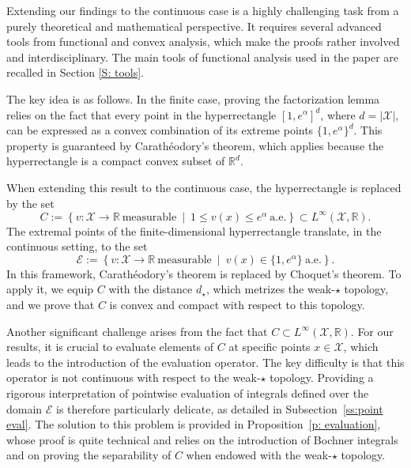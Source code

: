 \documentclass[a4paper, 11pt]{article}
\theoremstyle{definition}
\newcommand{\theconvex}{C}
\begin{document}
{Extending our findings to the continuous case is a highly challenging task from a purely theoretical and mathematical perspective. It requires several advanced tools from functional and convex analysis, 
which make the proofs rather involved and interdisciplinary. %
The main tools of functional analysis used in the paper are recalled in Section \ref{S: tools}.  


The key idea is as follows. In the finite case, proving the factorization lemma relies on the fact that every point in the hyperrectangle \([1, e^\alpha]^d\), where \(d = |\mathcal{X}|\), can be expressed as a convex combination of its extreme points \(\{1, e^\alpha\}^d\). This property is guaranteed by Carathéodory’s theorem, which applies because the hyperrectangle is a compact convex subset of \(\mathbb{R}^d\).

When extending this result to the continuous case, the hyperrectangle is replaced by the set
\[
\theconvex := \left\{ v : \mathcal{X} \rightarrow \mathbb{R} \ \text{measurable} \ \middle| \ 1 \leq v(x) \leq e^\alpha \ \text{a.e.} \right\} \subset L^\infty(\mathcal{X}, \mathbb{R}).
\]
The extremal points of the finite-dimensional hyperrectangle translate, in the continuous setting, to the set
\[
\mathcal{E} := \left\{ v : \mathcal{X} \rightarrow \mathbb{R} \ \text{measurable} \ \middle| \ v(x) \in \{1, e^\alpha\} \ \text{a.e.} \right\}.
\]
In this framework, Carathéodory’s theorem is replaced by Choquet’s theorem. To apply it, we equip \(\theconvex\) with the distance \(d_\star\), which metrizes the weak-\(\star\) topology, and we prove that \(\theconvex\) is convex and compact with respect to this topology.

Another significant challenge arises from the fact that \(\theconvex \subset L^\infty(\mathcal{X}, \mathbb{R})\). For our results, it is crucial to evaluate elements of \(\theconvex\) at specific points \(x \in \mathcal{X}\), which leads to the introduction of the evaluation operator. The key difficulty is that this operator is not continuous with respect to the weak-\(\star\) topology. Providing a rigorous interpretation of pointwise evaluation of integrals defined over the domain \(\mathcal{E}\) is therefore particularly delicate, as detailed in Subsection~\ref{ss:point eval}. The solution to this problem is provided in Proposition~\ref{p: evaluation}, whose proof is quite technical and relies on the introduction of Bochner integrals and on proving the separability of \(\theconvex\) when endowed with the weak-\(\star\) topology.

}
\end{document}
